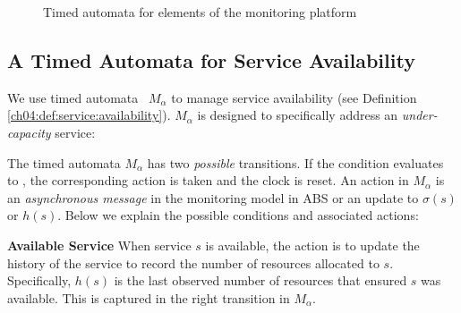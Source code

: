 \begin{figure}[t]
{
}


\caption{Timed automata for elements of the monitoring platform}
\label{ch04:fig:fsm}
\end{figure}

\subsection{A Timed Automata for Service Availability}
\label{ch04:sec:service:avail:fsm}

We use timed automata~\cite{alur:1994:timedautomata} $M_\alpha$ to manage service availability (see Definition \ref{ch04:def:service:availability}).
$M_\alpha$ is designed to specifically address an \emph{under-capacity} service:

The timed automata $M_\alpha$ has two \emph{possible} transitions.
If the condition evaluates to , the corresponding action is taken and the clock is reset.
An action in $M_\alpha$ is an \emph{asynchronous message} in the monitoring model in ABS or an update to $\sigma(s)$ or $h(s)$.
Below we explain the possible conditions and associated actions:

\textbf{Available Service}
  When service $s$ is available, the action is to update the history of the service to record the number of resources allocated to $s$. 
  Specifically, $h(s)$ is the last observed number of resources that ensured $s$ was available.
  This is captured in the right transition in $M_\alpha$.

